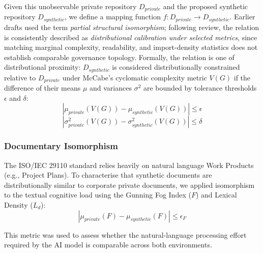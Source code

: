 \documentclass{ieeeaccess}
\begin{document}
Given this unobservable private repository $D_{private}$ and the proposed synthetic repository $D_{synthetic}$, we define a mapping function $f: D_{private} \rightarrow D_{synthetic}$. Earlier drafts used the term \emph{partial structural isomorphism}; following review, the relation is consistently described as \emph{distributional calibration under selected metrics}, since matching marginal complexity, readability, and import-density statistics does not establish comparable governance topology. Formally, the relation is one of distributional proximity: $D_{synthetic}$ is considered distributionally constrained relative to $D_{private}$ under McCabe's cyclomatic complexity metric $V(G)$ if the difference of their means $\mu$ and variances $\sigma^2$ are bounded by tolerance thresholds $\epsilon$ and $\delta$:
\begin{equation}
|\mu_{private}(V(G)) - \mu_{synthetic}(V(G))| \leq \epsilon
\label{eq:mean_iso}
\end{equation}
\begin{equation}
|\sigma^2_{private}(V(G)) - \sigma^2_{synthetic}(V(G))| \leq \delta
\label{eq:var_iso}
\end{equation}

\subsubsection{Documentary Isomorphism}

The ISO/IEC 29110 standard relies heavily on natural language Work Products (e.g., Project Plans). To characterise that synthetic documents are distributionally similar to corporate private documents, we applied isomorphism to the textual cognitive load using the Gunning Fog Index ($F$) and Lexical Density ($L_d$):
\begin{equation}
|\mu_{private}(F) - \mu_{synthetic}(F)| \leq \epsilon_F
\label{eq:fog_iso}
\end{equation}

This metric was used to assess whether the natural-language processing effort required by the AI model is comparable across both environments.
\end{document}
